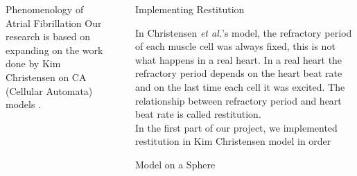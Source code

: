 \documentclass[final,hyperref={pdfpagelabels=false}]{beamer}
\begin{document}
\begin{frame}[t]
\begin{columns}[t]
\begin{column}{.465\textwidth}
\begin{block}{Phenomenology of Atrial Fibrillation}
 Our research is based on expanding on the work done by Kim Christensen on CA (Cellular Automata) models \cite{Christensen}.


\end{block}



\end{column} %

\begin{column}{.03\textwidth}\end{column} %
 
\begin{column}{.465\textwidth} %





\begin{block}{Implementing Restitution }

In Christensen \emph{et al.}'s model, the refractory period of each muscle cell was always fixed, this is not what happens in a real heart.
In a real heart the refractory period depends on the heart beat rate and on the last time each cell it was excited. The relationship between refractory period and heart beat rate is called restitution.
\\
In the first part of our project, we implemented restitution in Kim Christensen model in order

\end{block}



\begin{block}{Model on a Sphere}



\end{block}
\end{column}
\end{columns}
\end{frame}
\end{document}
